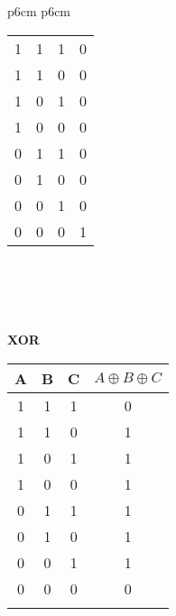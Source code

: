 \documentclass[letterpaper,12pt,titlepage]{article}
\begin{document}
\begin{center}
\begin{tabular}{p{6cm} p{6cm}}
\begin{tabular}{c | c | c | c}
1 	& 1 	& 1 	&   0		\\
1 	& 1 	& 0 	&   0		\\
1 	& 0 	& 1 	&   0		\\
1 	& 0 	& 0 	&   0		\\
0 	& 1 	& 1 	&   0		\\
0 	& 1 	& 0 	&   0		\\
0 	& 0 	& 1 	&   0		\\
0 	& 0 	& 0 	&   1		\\
\end{tabular}
\\\\\\\\
\textbf{XOR}
 \begin{tabular}{c | c | c | c}
A 	& B 	& C 	& $A \oplus B \oplus C$\\ \hline
1 	& 1 	& 1 	&   0		\\
1 	& 1 	& 0 	&   1		\\
1 	& 0 	& 1 	&   1		\\
1 	& 0 	& 0 	&   1		\\
0 	& 1 	& 1 	&   1		\\
0 	& 1 	& 0 	&   1		\\
0 	& 0 	& 1 	&   1		\\
0 	& 0 	& 0 	&   0		\\
&
\end{tabular}
\end{tabular}
\end{center}




\end{document}
